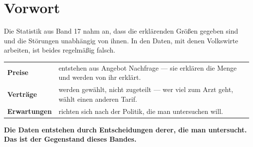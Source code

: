 \chapter*{Vorwort}

\begin{merksatz}
Die Statistik aus Band 17 nahm an, dass die erklärenden Größen gegeben sind und die Störungen unabhängig von ihnen. In den Daten, mit denen Volkswirte arbeiten, ist beides regelmäßig falsch.

\begin{center}
{\small
\renewcommand{\arraystretch}{1.52}
\begin{tabular}{@{}P{2.4cm}P{6.2cm}@{}}
\toprule
\textbf{Preise} & entstehen aus Angebot  Nachfrage --- sie erklären die Menge und werden von ihr erklärt.\\
\textbf{Verträge} & werden gewählt, nicht zugeteilt --- wer viel zum Arzt geht, wählt einen anderen Tarif.\\
\textbf{Erwartungen} & richten sich nach der Politik, die man untersuchen will.\\
\bottomrule
\end{tabular}}
\end{center}

\begin{center}
\begin{minipage}{0.9\textwidth}
\textbf{Die Daten entstehen durch Entscheidungen derer, die man untersucht. Das ist der Gegenstand dieses Bandes.}
\end{minipage}
\end{center}
\end{merksatz}


